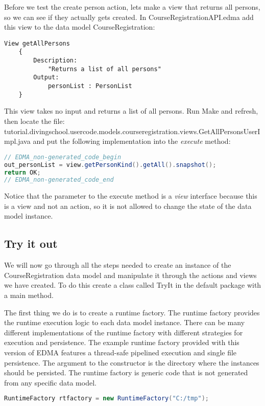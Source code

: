 Before we test the create person action, lets make a view that returns
all persons, so we can see if they actually gets created. In CourseRegistrationAPI.edma
add this view to the data model CourseRegistration:

\begin{lstlisting}[basicstyle={\scriptsize}]
	View getAllPersons
	{
		Description:
			"Returns a list of all persons"
		Output:
			personList : PersonList
	}
\end{lstlisting}


This view takes no input and returns a list of all persons. Run Make
and refresh, then locate the file: tutorial.divingschool.usercode.models.courseregistration.views.GetAllPersonsUserImpl.java
and put the following implementation into the \emph{execute} method:

\begin{lstlisting}[basicstyle={\scriptsize},language=Java,tabsize=2]
// EDMA_non-generated_code_begin
out_personList = view.getPersonKind().getAll().snapshot();
return OK;
// EDMA_non-generated_code_end
\end{lstlisting}


Notice that the parameter to the execute method is a \emph{view} interface
because this is a view and not an action, so it is not allowed to
change the state of the data model instance.


\subsection{Try it out}

We will now go through all the steps needed to create an instance
of the CourseRegistration data model and manipulate it through the
actions and views we have created. To do this create a class called
TryIt in the default package with a main method.

The first thing we do is to create a runtime factory. The runtime
factory provides the runtime execution logic to each data model instance.
There can be many different implementations of the runtime factory
with different strategies for execution and persistence. The example
runtime factory provided with this version of EDMA features a thread-safe
pipelined execution and single file persistence. The argument to the
constructor is the directory where the instances should be persisted.
The runtime factory is generic code that is not generated from any
specific data model.

\begin{lstlisting}[basicstyle={\scriptsize},language=Java,tabsize=2]
RuntimeFactory rtfactory = new RuntimeFactory("C:/tmp");
\end{lstlisting}


